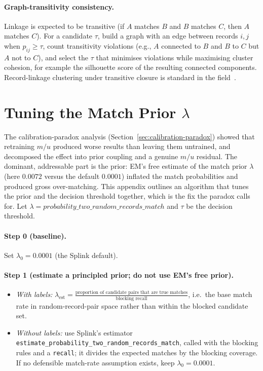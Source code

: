 \documentclass[conference]{IEEEtran}
\begin{document}
\begin{appendices}
\paragraph{Graph-transitivity consistency.} Linkage is expected to be transitive (if $A$ matches $B$ and $B$ matches $C$, then $A$ matches $C$). For a candidate $\tau$, build a graph with an edge between records $i,j$ when $p_{ij}\ge \tau$, count transitivity violations (e.g., $A$ connected to $B$ and $B$ to $C$ but $A$ not to $C$), and select the $\tau$ that minimises violations while maximising cluster cohesion, for example the silhouette score of the resulting connected components. Record-linkage clustering under transitive closure is standard in the field~\cite{christen2012}.

\section{Tuning the Match Prior $\lambda$}
\label{app:tune-prior}
The calibration-paradox analysis (Section~\ref{sec:calibration-paradox}) showed that retraining $m/u$ produced worse results than leaving them untrained, and decomposed the effect into prior coupling and a genuine $m/u$ residual. The dominant, addressable part is the prior: EM's free estimate of the match prior $\lambda$ (here $0.0072$ versus the default $0.0001$) inflated the match probabilities and produced gross over-matching. This appendix outlines an algorithm that tunes the prior and the decision threshold together, which is the fix the paradox calls for. Let $\lambda=\mathit{probability\_two\_random\_records\_match}$ and $\tau$ be the decision threshold.

\paragraph{Step 0 (baseline).} Set $\lambda_0 = 0.0001$ (the Splink default).

\paragraph{Step 1 (estimate a principled prior; do not use EM's free prior).}
\begin{itemize}
  \item \emph{With labels:} $\lambda_\mathrm{est}=\tfrac{\text{proportion of candidate pairs that are true matches}}{\text{blocking recall}}$, i.e.\ the base match rate in random-record-pair space rather than within the blocked candidate set.
  \item \emph{Without labels:} use Splink's estimator {\footnotesize\texttt{estimate\_probability\_two\_random\_records\_match}}, called with the blocking rules and a \texttt{recall}; it divides the expected matches by the blocking coverage. If no defensible match-rate assumption exists, keep $\lambda_0 = 0.0001$.
\end{itemize}


\end{appendices}
\end{document}
